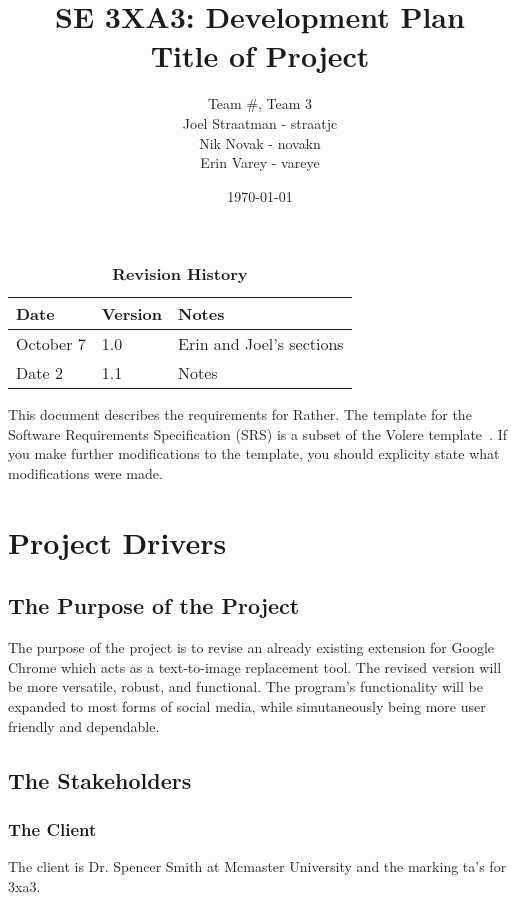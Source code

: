 \documentclass[12pt, titlepage]{article}
\title{SE 3XA3: Development Plan\\Title of Project}  %
\author{Team \#, Team 3  %
		\\ Joel Straatman - straatjc
		\\ Nik Novak - novakn
		\\ Erin Varey - vareye
}
\date{\today}
\begin{document}
\maketitle

\tableofcontents
\listoftables
\listoffigures

\begin{table}[bp]
\caption{\bf Revision History}
\begin{tabularx}{\textwidth}{p{3cm}p{2cm}X}
\toprule {\bf Date} & {\bf Version} & {\bf Notes}\\
\midrule
October 7 & 1.0 &  Erin and Joel's sections\\
Date 2 & 1.1 & Notes\\
\bottomrule
\end{tabularx}
\end{table}

\newpage


This document describes the requirements for Rather. The template for the Software
Requirements Specification (SRS) is a subset of the Volere
template~\citep{RobertsonAndRobertson2012}.  If you make further modifications
to the template, you should explicity state what modifications were made.

\section{Project Drivers}

\subsection{The Purpose of the Project}
The purpose of the project is to revise an already existing extension for Google Chrome which acts as a text-to-image replacement tool. The revised version will be more versatile, robust, and functional. The program's functionality will be expanded to most forms of social media, while simutaneously being more user friendly and dependable. 

\subsection{The Stakeholders}

\subsubsection{The Client}
The client is Dr. Spencer Smith at Mcmaster University and the marking ta's for 3xa3. %
\end{document}
